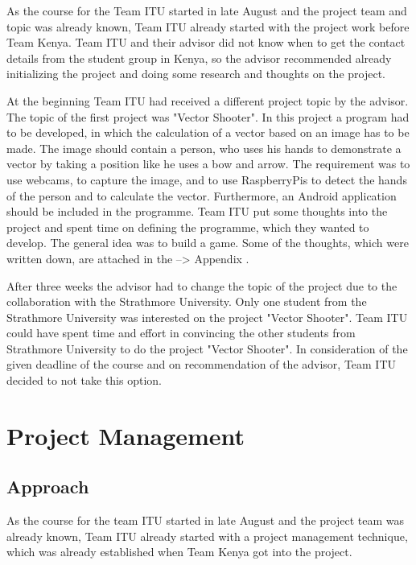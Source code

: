 As the course for the Team ITU started in late August and the project team and topic was already known, Team ITU already started with the project work before Team Kenya. Team ITU and their advisor did not know when to get the contact details from the student group in Kenya, so the advisor recommended already initializing the project and doing some research and thoughts on the project.

At the beginning Team ITU had received a different project topic by the advisor. The topic of the first project was "Vector Shooter". In this project a program had to be developed, in which the calculation of a vector based on an image has to be made. The image should contain a person, who uses his hands to demonstrate a vector by taking a position like he uses a bow and arrow. The requirement was to use webcams, to capture the image, and to use RaspberryPis to detect the hands of the person and to calculate the vector. Furthermore, an Android application should be included in the programme. Team ITU put some thoughts into the project and spent time on defining the programme, which they wanted to develop. The general idea was to build a game. Some of the thoughts, which were written down, are attached in the --> Appendix .

After three weeks the advisor had to change the topic of the project due to the collaboration with the Strathmore University. Only one student from the Strathmore University was interested on the project "Vector Shooter". Team ITU could have spent time and effort in convincing the other students from Strathmore University to do the project "Vector Shooter". In consideration of the given deadline of the course and on recommendation of the advisor, Team ITU decided to not take this option.


\section{Project Management}

\subsection{Approach}

As the course for the team ITU started in late August and the project team was already known, Team ITU already started with a project management technique, which was already established when Team Kenya got into the project.

